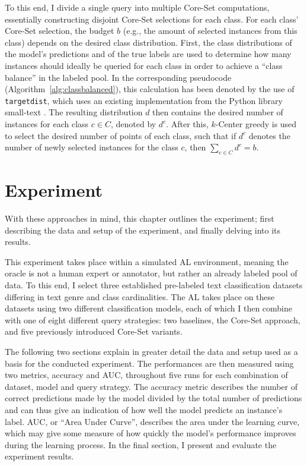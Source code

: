\documentclass[english,bachelor,ul]{webisthesis} %
\begin{document}
To this end, I divide a single query into multiple Core-Set computations, essentially constructing disjoint Core-Set selections for each class. For each class' Core-Set selection, the budget $ b $ (e.g., the amount of selected instances from this class) depends on the desired class distribution. First, the class distributions of the model's predictions and of the true labels are used to determine how many instances should ideally be queried for each class in order to achieve a ``class balance'' in the labeled pool. In the corresponding pseudocode (Algorithm~\ref{alg:classbalanced}), this calculation has been denoted by the use of \texttt{target\textunderscore dist}, which uses an existing implementation from the Python library small-text \citep{schroeder2023small-text}. The resulting distribution $ d $ then contains the desired number of instances for each class $ c \in C $, denoted by $ d^c $. After this, $k$-Center greedy is used to select the desired number of points of each class, such that if $ d^c $ denotes the number of newly selected instances for the class $ c $, then $ \sum_{c \in C} d^c = b $. 

\chapter{Experiment}

With these approaches in mind, this chapter outlines the experiment; first describing the data and setup of the experiment, and finally delving into its results. 

This experiment takes place within a simulated AL environment, meaning the oracle is not a human expert or annotator, but rather an already labeled pool of data. To this end, I select three established pre-labeled text classification datasets differing in text genre and class cardinalities. The AL takes place on these datasets using two different classification models, each of which I then combine with one of eight different query strategies: two baselines, the Core-Set approach, and five previously introduced Core-Set variants.

The following two sections explain in greater detail the data and setup used as a basis for the conducted experiment. The performances are then measured using two metrics, accuracy and AUC, throughout five runs for each combination of dataset, model and query strategy. The accuracy metric describes the number of correct predictions made by the model divided by the total number of predictions and can thus give an indication of how well the model predicts an instance's label. AUC, or ``Area Under Curve'', describes the area under the learning curve, which may give some measure of how quickly the model's performance improves during the learning process. In the final section, I present and evaluate the experiment results.
\end{document}
